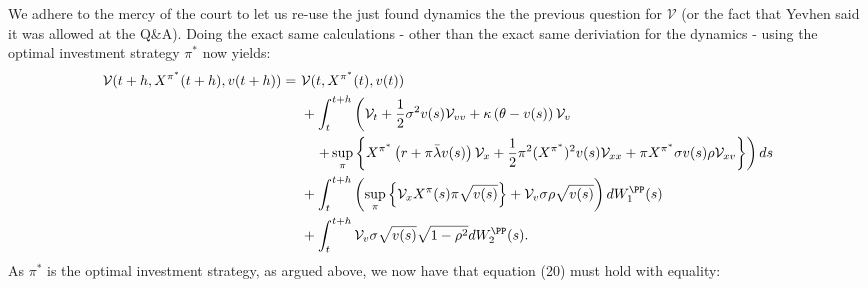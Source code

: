 \documentclass[11pt]{article}
\numberwithin{equation}{section}
\newcommand{\lc}{\left\{}
\newcommand{\rc}{\right\}}
\begin{document}
We adhere to the mercy of the court to let us re-use the just found dynamics the
the previous question for $\mathcal{V}$ (or the fact that Yevhen said it was
allowed at the Q\&A). Doing the exact same calculations
- other than the exact same deriviation for the dynamics - using the optimal investment strategy $\pi^*$ now yields:
\begin{align*}
    \mathcal{V}(t + h, X^{\pi^*}(t + h), v(t + h)) =\ &\mathcal{V}(t, X^{\pi^*}(t), v(t)) \\
    &+ \int_{t}^{t+h} \left( \mathcal{V}_t + \frac{1}{2} \sigma^2 v (s) \mathcal{V}_{vv} + \kappa \left( \theta - v(s) \right) \mathcal{V}_v \right. \\
    &\quad \left. + \sup_\pi \lc X^{\pi^*} \left( r + \pi \bar{\lambda} v(s) \right) \mathcal{V}_x + \frac{1}{2} \pi^2 (X^{\pi^*})^2 v(s) \mathcal{V}_{xx} + \pi X^{\pi^*} \sigma v(s) \rho \mathcal{V}_{xv} \rc \right) ds \\
    &+ \int_{t}^{t+h} \left( \sup_\pi \lc \mathcal{V}_x X^{\pi}(s) \pi \sqrt{v(s)} \rc + \mathcal{V}_v \sigma \rho \sqrt{v(s)} \right) dW^\PP_1(s) \\
    &+ \int_{t}^{t+h} \mathcal{V}_v \sigma \sqrt{v(s)} \sqrt{1 - \rho^2} dW^\PP_2(s).
\end{align*}
\newpage
As $\pi^*$ is the optimal investment strategy, as argued above, we now have that
equation (20) must hold with equality:
\end{document}
